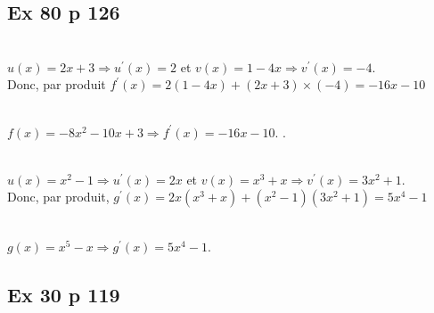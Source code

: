 \documentclass[12pt,a4paper]{book}
\begin{document}
\subsection*{Ex 80 p 126}
\begin{enumMet}
    \item 
    \begin{enumMet}
        \item {}\\
        $u(x)=2 x+3 \Rightarrow u^{\prime}(x)=2$ et $v(x)=1-4 x \Rightarrow v^{\prime}(x)=-4$.\\
Donc, par produit $f^{\prime}(x)=2(1-4 x)+(2 x+3) \times(-4)=-16 x-10$

        \item {}\\
        $f(x)=-8 x^{2}-10 x+3 \Rightarrow f^{\prime}(x)=-16 x-10$. .
    \end{enumMet}
    \item
    \begin{enumMet}
        \item {}\\
        $u(x)=x^{2}-1 \Rightarrow u^{\prime}(x)=2 x$ et
$v(x)=x^{3}+x \Rightarrow v^{\prime}(x)=3 x^{2}+1$.\\
Donc, par produit, $g^{\prime}(x)=2 x\left(x^{3}+x\right)+\left(x^{2}-1\right)\left(3 x^{2}+1\right)=5 x^{4}-1$
        \item {}\\
        $g(x)=x^{5}-x \Rightarrow g^{\prime}(x)=5 x^{4}-1$.
    \end{enumMet}
\end{enumMet}

\subsection*{Ex 30 p 119}
\end{document}
